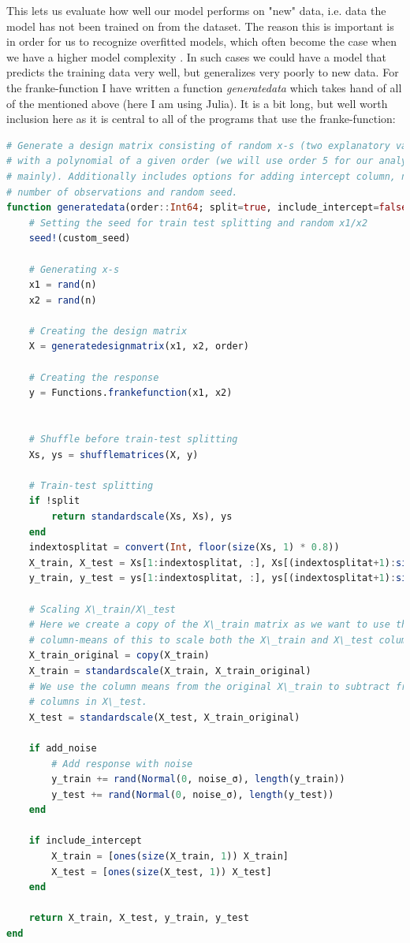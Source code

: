 \documentclass{article}
\begin{document}
This lets us evaluate how well our model performs on "new" data, i.e. data the
model has not been trained on from the dataset. The reason this is important is
in order for us to recognize overfitted models, which often become the case when
we have a higher model complexity \cite[s.~7.2]{hastie2009elements}. In such
cases we could have a model that predicts the training data very well, but
generalizes very poorly to new data.  For the franke-function I have written a
function \textit{generatedata} which takes hand of all of the mentioned above
(here I am using Julia). It is a bit long, but well worth inclusion here as it
is central to all of the programs that use the franke-function:
\begin{lstlisting}[language=julia]
# Generate a design matrix consisting of random x-s (two explanatory variables)
# with a polynomial of a given order (we will use order 5 for our analysis
# mainly). Additionally includes options for adding intercept column, noise,
# number of observations and random seed.
function generatedata(order::Int64; split=true, include_intercept=false, add_noise=false, noise_σ=0.1, n=200, custom_seed=1000)
    # Setting the seed for train test splitting and random x1/x2
    seed!(custom_seed)

    # Generating x-s
    x1 = rand(n)
    x2 = rand(n)

    # Creating the design matrix
    X = generatedesignmatrix(x1, x2, order)

    # Creating the response
    y = Functions.frankefunction(x1, x2)


    # Shuffle before train-test splitting
    Xs, ys = shufflematrices(X, y)

    # Train-test splitting
    if !split
        return standardscale(Xs, Xs), ys
    end
    indextosplitat = convert(Int, floor(size(Xs, 1) * 0.8))
    X_train, X_test = Xs[1:indextosplitat, :], Xs[(indextosplitat+1):size(Xs, 1), :]
    y_train, y_test = ys[1:indextosplitat, :], ys[(indextosplitat+1):size(ys, 1), :]

    # Scaling X\_train/X\_test
    # Here we create a copy of the X\_train matrix as we want to use the
    # column-means of this to scale both the X\_train and X\_test columns.
    X_train_original = copy(X_train)
    X_train = standardscale(X_train, X_train_original)
    # We use the column means from the original X\_train to subtract from the
    # columns in X\_test.
    X_test = standardscale(X_test, X_train_original)

    if add_noise
        # Add response with noise
        y_train += rand(Normal(0, noise_σ), length(y_train))
        y_test += rand(Normal(0, noise_σ), length(y_test))
    end

    if include_intercept
        X_train = [ones(size(X_train, 1)) X_train]
        X_test = [ones(size(X_test, 1)) X_test]
    end

    return X_train, X_test, y_train, y_test
end
\end{lstlisting}
\end{document}
